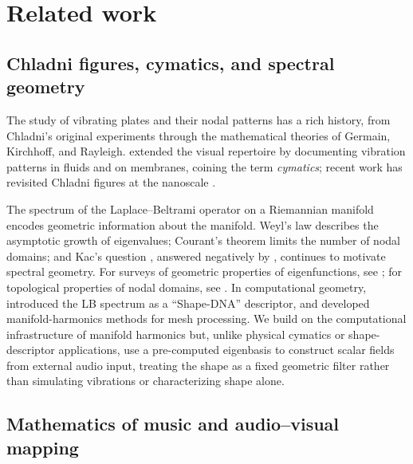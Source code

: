 \documentclass[]{interact}
\theoremstyle{plain}
\theoremstyle{definition}
\theoremstyle{remark}
\begin{document}
\section{Related work}
\label{sec:related}

\subsection{Chladni figures, cymatics, and spectral geometry}

The study of vibrating plates and their nodal patterns has a rich history, from Chladni's original experiments \citep{chladni1787entdeckungen,chladni1830} through the mathematical theories of Germain, Kirchhoff, and Rayleigh. \citet{jenny2001} extended the visual repertoire by documenting vibration patterns in fluids and on membranes, coining the term \emph{cymatics}; recent work has revisited Chladni figures at the nanoscale \citep{dorrestijn2007chladni}.

The spectrum of the Laplace--Beltrami operator on a Riemannian manifold encodes geometric information about the manifold. Weyl's law \citep{jrgens1964} describes the asymptotic growth of eigenvalues; Courant's theorem \citep{courant1923allgemeiner} limits the number of nodal domains; and Kac's question \citep{kac1966}, answered negatively by \citet{gordon1992}, continues to motivate spectral geometry. For surveys of geometric properties of eigenfunctions, see \citet{jakobson2001}; for topological properties of nodal domains, see \citet{band2016}. In computational geometry, \citet{reuter2006laplace} introduced the LB spectrum as a ``Shape-DNA'' descriptor, and \citet{vallet2008} developed manifold-harmonics methods for mesh processing. We build on the computational infrastructure of manifold harmonics but, unlike physical cymatics or shape-descriptor applications, use a pre-computed eigenbasis to construct scalar fields from external audio input, treating the shape as a fixed geometric filter rather than simulating vibrations or characterizing shape alone.

\subsection{Mathematics of music and audio--visual mapping}
\end{document}
